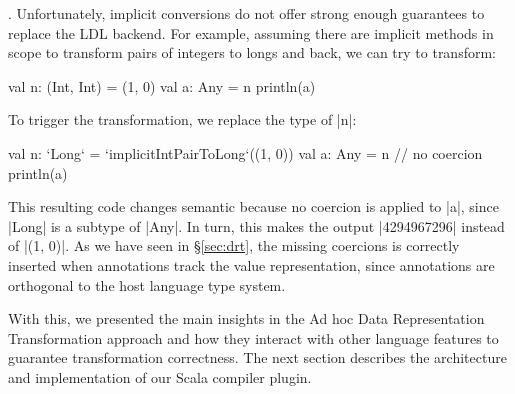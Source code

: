 . Unfortunately, implicit conversions do not offer strong enough guarantees to replace the LDL backend. For example, assuming there are implicit methods in scope to transform pairs of integers to longs and back, we can try to transform:

\begin{lstlisting-nobreak}
val n: (Int, Int) = (1, 0)
val a: Any = n
println(a)
\end{lstlisting-nobreak}

To trigger the transformation, we replace the type of |n|: %

\begin{lstlisting-nobreak}
val n: `Long` = `implicitIntPairToLong`((1, 0))
val a: Any = n // no coercion
println(a)
\end{lstlisting-nobreak}

This resulting code changes semantic because no coercion is applied to |a|, since |Long| is a subtype of |Any|. In turn, this makes the output |4294967296| instead of |(1, 0)|. As we have seen in \S\ref{sec:drt}, the missing coercions is correctly inserted when annotations track the value representation,
since annotations are orthogonal to the host language type system.

With this, we presented the main insights in the Ad hoc Data Representation Transformation approach and how they interact with other language features to guarantee transformation correctness. The next section describes the architecture and implementation of our Scala compiler plugin.





